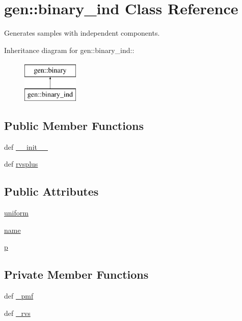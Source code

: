 \hypertarget{classgen_1_1binary__ind}{
\section{gen::binary\_\-ind Class Reference}
\label{classgen_1_1binary__ind}
}
Generates samples with independent components.  


Inheritance diagram for gen::binary\_\-ind::\begin{figure}[H]
\begin{center}
\leavevmode
\includegraphics[height=2cm]{classgen_1_1binary__ind}
\end{center}
\end{figure}
\subsection*{Public Member Functions}
\begin{CompactItemize}
\item 
def \hyperlink{classgen_1_1binary__ind_d0e8fc3004c8d408ee9fa3b6839aa42e}{\_\-\_\-init\_\-\_\-}
\item 
def \hyperlink{classgen_1_1binary__ind_12b4f2b47589e167adfd9a96b6b522e3}{rvsplus}
\end{CompactItemize}
\subsection*{Public Attributes}
\begin{CompactItemize}
\item 
\hyperlink{classgen_1_1binary__ind_b652d5708c5922cd848116cea088ae0f}{uniform}
\item 
\hyperlink{classgen_1_1binary__ind_8f25f23a5444665383f9551a365448d0}{name}
\item 
\hyperlink{classgen_1_1binary__ind_aaf37ef74e482395cbcfb9ceaf1b564a}{p}
\end{CompactItemize}
\subsection*{Private Member Functions}
\begin{CompactItemize}
\item 
def \hyperlink{classgen_1_1binary__ind_a3f4f58e3d2b548ba7a6c23bde46f76a}{\_\-pmf}
\item 
def \hyperlink{classgen_1_1binary__ind_dad1028ef36ee6b4263db54395168586}{\_\-rvs}
\end{CompactItemize}


